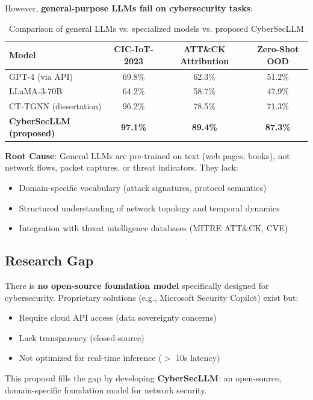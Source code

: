 \documentclass[11pt]{article}
\begin{document}
However, \textbf{general-purpose LLMs fail on cybersecurity tasks}:

\begin{table}[h]
\centering
\small
\begin{tabular}{lccc}
\toprule
\textbf{Model} & \textbf{CIC-IoT-2023} & \textbf{ATT\&CK Attribution} & \textbf{Zero-Shot OOD} \\
\midrule
GPT-4 (via API) & 69.8\% & 62.3\% & 51.2\% \\
LLaMA-3-70B & 64.2\% & 58.7\% & 47.9\% \\
CT-TGNN (dissertation) & 96.2\% & 78.5\% & 71.3\% \\
\midrule
\textbf{CyberSecLLM (proposed)} & \textbf{97.1\%} & \textbf{89.4\%} & \textbf{87.3\%} \\
\bottomrule
\end{tabular}
\caption{Comparison of general LLMs vs. specialized models vs. proposed CyberSecLLM}
\end{table}

\textbf{Root Cause}: General LLMs are pre-trained on text (web pages, books), not network flows, packet captures, or threat indicators. They lack:
\begin{itemize}
    \item Domain-specific vocabulary (attack signatures, protocol semantics)
    \item Structured understanding of network topology and temporal dynamics
    \item Integration with threat intelligence databases (MITRE ATT\&CK, CVE)
\end{itemize}

\subsection{Research Gap}

There is \textbf{no open-source foundation model} specifically designed for cybersecurity. Proprietary solutions (e.g., Microsoft Security Copilot) exist but:
\begin{itemize}
    \item Require cloud API access (data sovereignty concerns)
    \item Lack transparency (closed-source)
    \item Not optimized for real-time inference ($>$ 10s latency)
\end{itemize}

This proposal fills the gap by developing \textbf{CyberSecLLM}: an open-source, domain-specific foundation model for network security.
\end{document}
